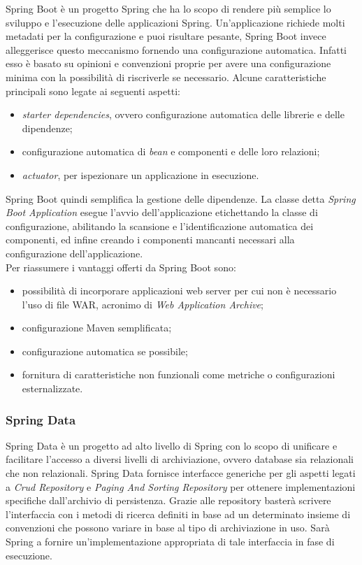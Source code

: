 Spring Boot è un progetto Spring che ha lo scopo di rendere più semplice lo sviluppo e l'esecuzione delle applicazioni Spring. Un'applicazione richiede molti metadati per la configurazione e puoi risultare pesante, Spring Boot invece alleggerisce questo meccanismo fornendo una configurazione automatica. Infatti esso è basato su opinioni e convenzioni proprie per avere una configurazione minima con la possibilità di riscriverle se necessario. Alcune caratteristiche principali sono legate ai seguenti aspetti:
\begin{itemize}
	\item \textit{starter dependencies}, ovvero configurazione automatica delle librerie e delle dipendenze;
	\item configurazione automatica di \textit{bean} e componenti e delle loro relazioni;
	\item \textit{actuator}, per ispezionare un applicazione in esecuzione.
\end{itemize} 
Spring Boot quindi semplifica la gestione delle dipendenze. La classe detta \textit{Spring Boot Application} esegue l'avvio dell'applicazione etichettando la classe di configurazione, abilitando la scansione e l'identificazione automatica dei componenti, ed infine creando i componenti mancanti necessari alla configurazione dell'applicazione.\\
Per riassumere i vantaggi offerti da Spring Boot sono:
\begin{itemize}
	\item possibilità di incorporare applicazioni web server per cui non è necessario l'uso di file WAR, acronimo di \textit{Web Application Archive};
	\item configurazione Maven semplificata;
	\item configurazione automatica se possibile;
	\item fornitura di caratteristiche non funzionali come metriche o configurazioni esternalizzate.
\end{itemize}

\subsubsection{Spring Data}
\label{subsubsec:spring-data}

Spring Data è un progetto ad alto livello di Spring con lo scopo di unificare e facilitare l'accesso a diversi livelli di archiviazione, ovvero database sia relazionali che non relazionali. Spring Data fornisce interfacce generiche per gli aspetti legati a \textit{Crud Repository} e \textit{Paging And Sorting Repository} per ottenere implementazioni specifiche dall'archivio di persistenza. Grazie alle repository basterà scrivere l'interfaccia con i metodi di ricerca definiti in base ad un determinato insieme di convenzioni che possono variare in base al tipo di archiviazione in uso. Sarà Spring  a fornire un'implementazione appropriata di tale interfaccia in fase di esecuzione.

